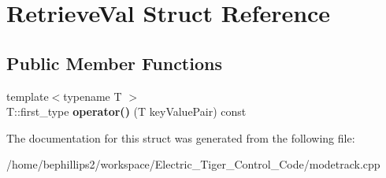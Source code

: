 \hypertarget{struct_retrieve_val}{\section{Retrieve\-Val Struct Reference}
\label{struct_retrieve_val}
}
\subsection*{Public Member Functions}
\begin{DoxyCompactItemize}
\item 
\hypertarget{struct_retrieve_val_a497045c23da008812919a69049998b1e}{{\footnotesize template$<$typename T $>$ }\\T\-::first\-\_\-type {\bfseries operator()} (T key\-Value\-Pair) const }\label{struct_retrieve_val_a497045c23da008812919a69049998b1e}

\end{DoxyCompactItemize}


The documentation for this struct was generated from the following file\-:\begin{DoxyCompactItemize}
\item 
/home/bephillips2/workspace/\-Electric\-\_\-\-Tiger\-\_\-\-Control\-\_\-\-Code/modetrack.\-cpp\end{DoxyCompactItemize}
